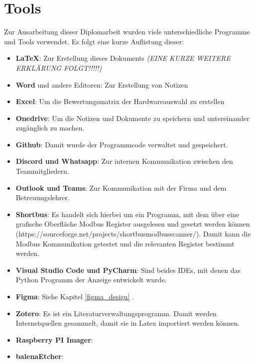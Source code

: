 \ifoot{\leftmark}
\chapter{Tools}
\noindent Zur Ausarbeitung dieser Diplomarbeit wurden viele unterschiedliche Programme und Tools verwendet. Es folgt eine kurze Auflistung dieser:
\begin{itemize}
	\item \textbf{\LaTeX}: Zur Erstellung dieses Dokuments \textit{(EINE KURZE WEITERE ERKLÄRUNG FOLGT!!!!!)}
	\item \textbf{Word} und andere Editoren: Zur Erstellung von Notizen
	\item \textbf{Excel}: Um die Bewertungsmatrix der Hardwareauswahl zu erstellen
	\item \textbf{Onedrive}: Um die Notizen und Dokumente zu speichern und untereinander zugänglich zu machen.
	\item \textbf{Github}: Damit wurde der Programmcode verwaltet und gespeichert.
	\item \textbf{Discord und Whatsapp}: Zur internen Kommunikation zwischen den Teammitgliedern.
	\item \textbf{Outlook und Teams}: Zur Kommunikation mit der Firma und dem Betreuungslehrer.
	\item \textbf{Shortbus}: Es handelt sich hierbei um ein Programm, mit dem über eine grafische Oberfläche Modbus Register ausgelesen und gesetzt werden können (https://sourceforge.net/projects/shortbusmodbusscanner/). Damit kann die Modbus Kommunikation getestet und die relevanten Register bestimmt werden.
	\item \textbf{Visual Studio Code und PyCharm}: Sind beides IDEs, mit denen das Python Programm der Anzeige entwickelt wurde.
	\item \textbf{Figma}: Siehe Kapitel \ref{figma_design} .
	\item \textbf{Zotero}: Es ist ein Literaturverwaltungsprogramm. Damit werden Internetquellen gesammelt, damit sie in Latex importiert werden können.
    \item \textbf{Raspberry PI Imager}:
    \item \textbf{balenaEtcher}:
\end{itemize}
